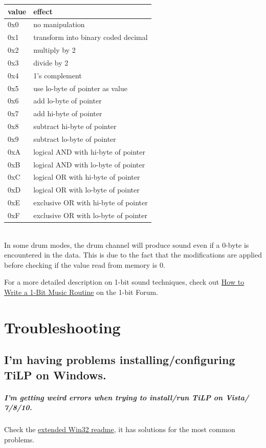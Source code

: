 \documentclass[12pt]{report}	%
\begin{document}
\begin{appendices}
\begin{tabularx}{\textwidth}{p{} X}
\textbf{value} & \textbf{effect} \\
\hline
0x0 & no manipulation \\
0x1 & transform into binary coded decimal \\
0x2 & multiply by 2 \\
0x3 & divide by 2 \\
0x4 & 1's complement \\
0x5 & use lo-byte of pointer as value \\
0x6 & add lo-byte of pointer \\
0x7 & add hi-byte of pointer \\
0x8 & subtract hi-byte of pointer \\
0x9 & subtract lo-byte of pointer \\
0xA & logical AND with hi-byte of pointer \\
0xB & logical AND with lo-byte of pointer \\
0xC & logical OR with hi-byte of pointer \\
0xD & logical OR with lo-byte of pointer \\
0xE & exclusive OR with hi-byte of pointer \\
0xF & exclusive OR with lo-byte of pointer \\
\end{tabularx} ~\\


In some drum modes, the drum channel will produce sound even if a 0-byte is encountered in the data. This is due to the fact that the modifications are applied before checking if the value read from memory is 0.

For a more detailed description on 1-bit sound techniques, check out \href{http://randomflux.info/1bit/viewtopic.php?id=21}{How to Write a 1-Bit Music Routine} on the 1-bit Forum.

\chapter{Troubleshooting}
\label{sec:troubleshoot}
\section{I'm having problems installing/configuring TiLP on Windows.}
\paragraph{I'm getting weird errors when trying to install/run TiLP on Vista/ 7/8/10.} Check the \href{https://github.com/debrouxl/tilp_and_gfm/blob/master/tilp/trunk/README.win32}{extended Win32 readme}, it has solutions for the most common problems.


\end{appendices}
\end{document}
